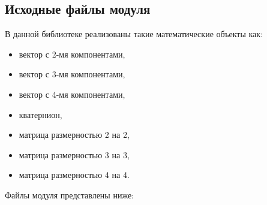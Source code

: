\subsection{Исходные файлы модуля }

В данной библиотеке реализованы такие математические объекты как:

\begin{itemize}[label=---]
    \item вектор с 2-мя компонентами,
    \item вектор с 3-мя компонентами,
    \item вектор с 4-мя компонентами,
    \item кватернион,
    \item матрица размерностью 2 на 2,
    \item матрица размерностью 3 на 3,
    \item матрица размерностью 4 на 4.
\end{itemize}

Файлы модуля представлены ниже:


